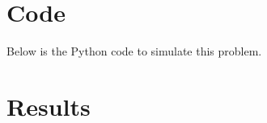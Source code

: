 \documentclass[12pt]{article}
\begin{document}
\clearpage

\section{Code}
Below is the Python code to simulate this problem.


\clearpage


\section{Results}
\end{document}
